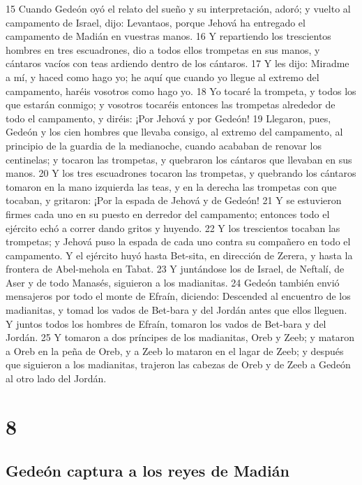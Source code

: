 15 Cuando Gedeón oyó el relato del sueño y su interpretación, adoró; y vuelto al campamento de Israel, dijo: Levantaos, porque Jehová ha entregado el campamento de Madián en vuestras manos.
16 Y repartiendo los trescientos hombres en tres escuadrones, dio a todos ellos trompetas en sus manos, y cántaros vacíos con teas ardiendo dentro de los cántaros.
17 Y les dijo: Miradme a mí, y haced como hago yo; he aquí que cuando yo llegue al extremo del campamento, haréis vosotros como hago yo.
18 Yo tocaré la trompeta, y todos los que estarán conmigo; y vosotros tocaréis entonces las trompetas alrededor de todo el campamento, y diréis: ¡Por Jehová y por Gedeón!
19 Llegaron, pues, Gedeón y los cien hombres que llevaba consigo, al extremo del campamento, al principio de la guardia de la medianoche, cuando acababan de renovar los centinelas; y tocaron las trompetas, y quebraron los cántaros que llevaban en sus manos.
20 Y los tres escuadrones tocaron las trompetas, y quebrando los cántaros tomaron en la mano izquierda las teas, y en la derecha las trompetas con que tocaban, y gritaron: ¡Por la espada de Jehová y de Gedeón!
21 Y se estuvieron firmes cada uno en su puesto en derredor del campamento; entonces todo el ejército echó a correr dando gritos y huyendo.
22 Y los trescientos tocaban las trompetas; y Jehová puso la espada de cada uno contra su compañero en todo el campamento. Y el ejército huyó hasta Bet-sita, en dirección de Zerera, y hasta la frontera de Abel-mehola en Tabat.
23 Y juntándose los de Israel, de Neftalí, de Aser y de todo Manasés, siguieron a los madianitas.
24 Gedeón también envió mensajeros por todo el monte de Efraín, diciendo: Descended al encuentro de los madianitas, y tomad los vados de Bet-bara y del Jordán antes que ellos lleguen. Y juntos todos los hombres de Efraín, tomaron los vados de Bet-bara y del Jordán.
25 Y tomaron a dos príncipes de los madianitas, Oreb y Zeeb; y mataron a Oreb en la peña de Oreb, y a Zeeb lo mataron en el lagar de Zeeb; y después que siguieron a los madianitas, trajeron las cabezas de Oreb y de Zeeb a Gedeón al otro lado del Jordán.

\chapter{8}

\section*{Gedeón captura a los reyes de Madián}


